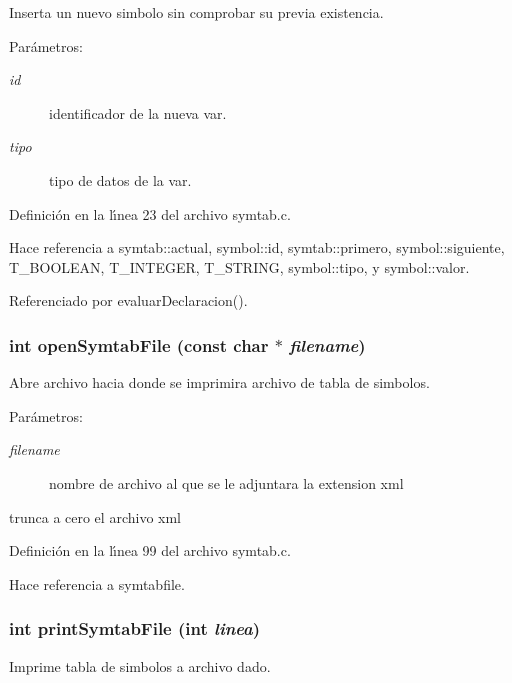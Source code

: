 Inserta un nuevo simbolo sin comprobar su previa existencia. 

\begin{Desc}
\item[Par\'{a}metros:]
\begin{description}
\item[{\em id}]identificador de la nueva var. \item[{\em tipo}]tipo de datos de la var. \end{description}
\end{Desc}


Definici\'{o}n en la l\'{\i}nea 23 del archivo symtab.c.

Hace referencia a symtab::actual, symbol::id, symtab::primero, symbol::siguiente, T\_\-BOOLEAN, T\_\-INTEGER, T\_\-STRING, symbol::tipo, y symbol::valor.

Referenciado por evaluar\-Declaracion().
\subsubsection{\setlength{\rightskip}{0pt plus 5cm}int open\-Symtab\-File (const char $\ast$ {\em filename})}\label{symtab_8c_a6}


Abre archivo hacia donde se imprimira archivo de tabla de simbolos. 

\begin{Desc}
\item[Par\'{a}metros:]
\begin{description}
\item[{\em filename}]nombre de archivo al que se le adjuntara la extension xml\end{description}
\end{Desc}
trunca a cero el archivo xml 

Definici\'{o}n en la l\'{\i}nea 99 del archivo symtab.c.

Hace referencia a symtabfile.
\subsubsection{\setlength{\rightskip}{0pt plus 5cm}int print\-Symtab\-File (int {\em linea})}\label{symtab_8c_a8}


Imprime tabla de simbolos a archivo dado. 

